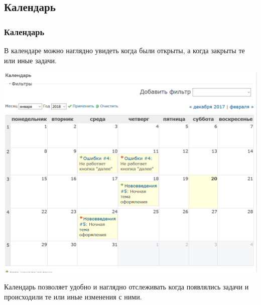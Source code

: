 \documentclass{../industrial-development}
\begin{document}
\subsection{Календарь}
\begin{frame} \frametitle{Календарь}
В календаре можно наглядно увидеть когда были открыты, а когда закрыты те или иные задачи.
\centerline{\includegraphics[width=\textwidth]{calendar.png}}
\end{frame}
\lecturenotes
Календарь позволяет удобно и наглядно отслеживать когда появлялись задачи и происходили те или иные изменения с ними.
\end{document}
